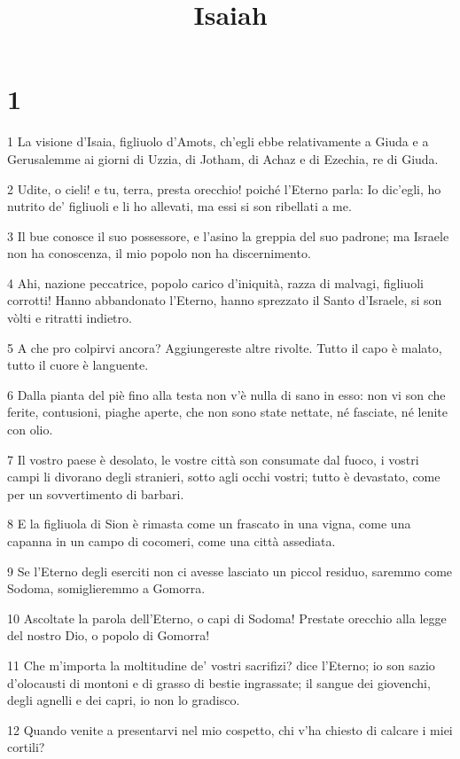 

\title{Isaiah}


\chapter{1}

\par 1 La visione d'Isaia, figliuolo d'Amots, ch'egli ebbe relativamente a Giuda e a Gerusalemme ai giorni di Uzzia, di Jotham, di Achaz e di Ezechia, re di Giuda.
\par 2 Udite, o cieli! e tu, terra, presta orecchio! poiché l'Eterno parla: Io dic'egli, ho nutrito de' figliuoli e li ho allevati, ma essi si son ribellati a me.
\par 3 Il bue conosce il suo possessore, e l'asino la greppia del suo padrone; ma Israele non ha conoscenza, il mio popolo non ha discernimento.
\par 4 Ahi, nazione peccatrice, popolo carico d'iniquità, razza di malvagi, figliuoli corrotti! Hanno abbandonato l'Eterno, hanno sprezzato il Santo d'Israele, si son vòlti e ritratti indietro.
\par 5 A che pro colpirvi ancora? Aggiungereste altre rivolte. Tutto il capo è malato, tutto il cuore è languente.
\par 6 Dalla pianta del piè fino alla testa non v'è nulla di sano in esso: non vi son che ferite, contusioni, piaghe aperte, che non sono state nettate, né fasciate, né lenite con olio.
\par 7 Il vostro paese è desolato, le vostre città son consumate dal fuoco, i vostri campi li divorano degli stranieri, sotto agli occhi vostri; tutto è devastato, come per un sovvertimento di barbari.
\par 8 E la figliuola di Sion è rimasta come un frascato in una vigna, come una capanna in un campo di cocomeri, come una città assediata.
\par 9 Se l'Eterno degli eserciti non ci avesse lasciato un piccol residuo, saremmo come Sodoma, somiglieremmo a Gomorra.
\par 10 Ascoltate la parola dell'Eterno, o capi di Sodoma! Prestate orecchio alla legge del nostro Dio, o popolo di Gomorra!
\par 11 Che m'importa la moltitudine de' vostri sacrifizi? dice l'Eterno; io son sazio d'olocausti di montoni e di grasso di bestie ingrassate; il sangue dei giovenchi, degli agnelli e dei capri, io non lo gradisco.
\par 12 Quando venite a presentarvi nel mio cospetto, chi v'ha chiesto di calcare i miei cortili?
